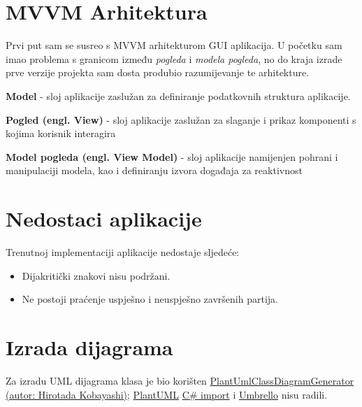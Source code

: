 \documentclass[12pt,a4paper]{report}
\begin{document}
\hypertarget{mvvm-arhitektura}{%
\chapter{MVVM Arhitektura}\label{mvvm-arhitektura}}

Prvi put sam se susreo s MVVM arhitekturom GUI aplikacija. U početku sam
imao problema s granicom između \emph{pogleda} i \emph{modela pogleda},
no do kraja izrade prve verzije projekta sam dosta produbio
razumijevanje te arhitekture.

\textbf{Model} - sloj aplikacije zaslužan za definiranje podatkovnih
struktura aplikacije.

\textbf{Pogled (engl. View)} - sloj aplikacije zaslužan za slaganje i prikaz komponenti
s kojima korisnik interagira

\textbf{Model pogleda (engl. View Model)} - sloj aplikacije namijenjen
pohrani i manipulaciji modela, kao i definiranju izvora događaja za
reaktivnost

\hypertarget{nedostaci-aplikacije}{%
\chapter{Nedostaci aplikacije}\label{nedostaci-aplikacije}}

Trenutnoj implementaciji aplikacije nedostaje sljedeće:
\begin{itemize}
    \item Dijakritički znakovi nisu podržani.
    \item Ne postoji praćenje uspješno i neuspješno završenih partija.
\end{itemize}

\hypertarget{izrada-dijagrama}{%
\chapter{Izrada dijagrama}\label{izrada-dijagrama}}

Za izradu UML dijagrama klasa je bio korišten
\href{https://github.com/pierre3/PlantUmlClassDiagramGenerator}{PlantUmlClassDiagramGenerator
(autor: Hirotada Kobayashi)}; \href{https://staruml.io/}{PlantUML}
\href{https://github.com/staruml/staruml-csharp}{C\# import} i
\href{https://apps.kde.org/umbrello/}{Umbrello} nisu radili.
    
\end{document}
